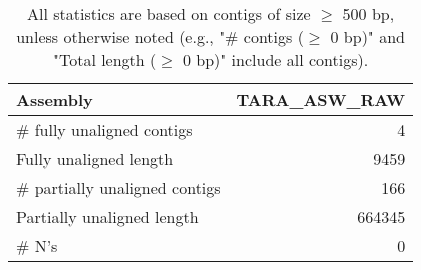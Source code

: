\documentclass[12pt,a4paper]{article}
\begin{document}
\begin{table}[ht]
\begin{center}
\caption{All statistics are based on contigs of size $\geq$ 500 bp, unless otherwise noted (e.g., "\# contigs ($\geq$ 0 bp)" and "Total length ($\geq$ 0 bp)" include all contigs).}
\begin{tabular}{|l*{1}{|r}|}
\hline
Assembly & TARA\_ASW\_RAW \\ \hline
\# fully unaligned contigs & 4 \\ \hline
Fully unaligned length & 9459 \\ \hline
\# partially unaligned contigs & 166 \\ \hline
Partially unaligned length & 664345 \\ \hline
\# N's & 0 \\ \hline
\end{tabular}
\end{center}
\end{table}
\end{document}
